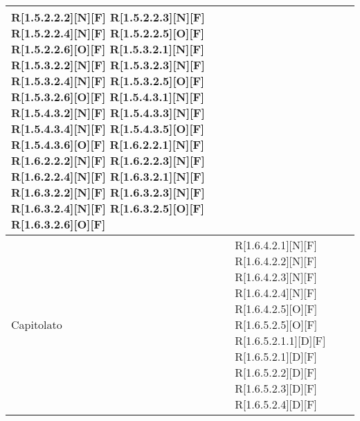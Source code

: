 \begin{longtable}{X | X}
R[1.5.2.2.2][N][F] \newline
R[1.5.2.2.3][N][F] \newline
R[1.5.2.2.4][N][F] \newline
R[1.5.2.2.5][O][F] \newline
R[1.5.2.2.6][O][F] \newline
R[1.5.3.2.1][N][F] \newline
R[1.5.3.2.2][N][F] \newline
R[1.5.3.2.3][N][F] \newline
R[1.5.3.2.4][N][F] \newline
R[1.5.3.2.5][O][F] \newline
R[1.5.3.2.6][O][F] \newline
R[1.5.4.3.1][N][F] \newline
R[1.5.4.3.2][N][F] \newline
R[1.5.4.3.3][N][F] \newline
R[1.5.4.3.4][N][F] \newline
R[1.5.4.3.5][O][F] \newline
R[1.5.4.3.6][O][F] \newline
R[1.6.2.2.1][N][F] \newline
R[1.6.2.2.2][N][F] \newline
R[1.6.2.2.3][N][F] \newline
R[1.6.2.2.4][N][F] \newline
R[1.6.3.2.1][N][F] \newline
R[1.6.3.2.2][N][F] \newline
R[1.6.3.2.3][N][F] \newline
R[1.6.3.2.4][N][F] \newline
R[1.6.3.2.5][O][F] \newline
R[1.6.3.2.6][O][F] 
\\
\hline Capitolato &
R[1.6.4.2.1][N][F] \newline
R[1.6.4.2.2][N][F] \newline
R[1.6.4.2.3][N][F] \newline
R[1.6.4.2.4][N][F] \newline
R[1.6.4.2.5][O][F] \newline
R[1.6.5.2.5][O][F] \newline
R[1.6.5.2.1.1][D][F] \newline
R[1.6.5.2.1][D][F] \newline
R[1.6.5.2.2][D][F] \newline
R[1.6.5.2.3][D][F] \newline
R[1.6.5.2.4][D][F] \newline

\end{longtable}
